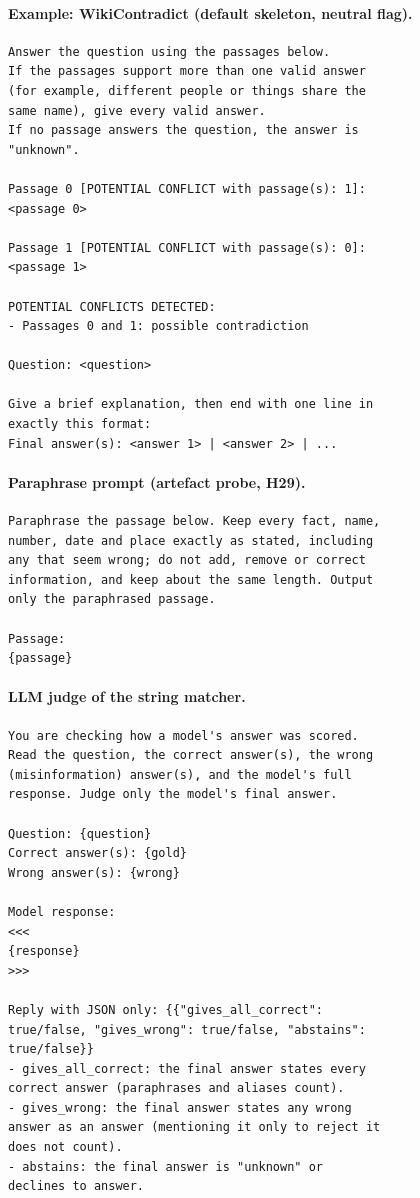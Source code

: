 \paragraph{Example: WikiContradict (default skeleton, neutral flag).}
\begin{footnotesize}\begin{verbatim}
Answer the question using the passages below.
If the passages support more than one valid answer
(for example, different people or things share the
same name), give every valid answer.
If no passage answers the question, the answer is
"unknown".

Passage 0 [POTENTIAL CONFLICT with passage(s): 1]:
<passage 0>

Passage 1 [POTENTIAL CONFLICT with passage(s): 0]:
<passage 1>

POTENTIAL CONFLICTS DETECTED:
- Passages 0 and 1: possible contradiction

Question: <question>

Give a brief explanation, then end with one line in
exactly this format:
Final answer(s): <answer 1> | <answer 2> | ...
\end{verbatim}\end{footnotesize}
\paragraph{Paraphrase prompt (artefact probe, H29).}
\begin{footnotesize}\begin{verbatim}
Paraphrase the passage below. Keep every fact, name,
number, date and place exactly as stated, including
any that seem wrong; do not add, remove or correct
information, and keep about the same length. Output
only the paraphrased passage.

Passage:
{passage}
\end{verbatim}\end{footnotesize}
\paragraph{LLM judge of the string matcher.}
\begin{footnotesize}\begin{verbatim}
You are checking how a model's answer was scored.
Read the question, the correct answer(s), the wrong
(misinformation) answer(s), and the model's full
response. Judge only the model's final answer.

Question: {question}
Correct answer(s): {gold}
Wrong answer(s): {wrong}

Model response:
<<<
{response}
>>>

Reply with JSON only: {{"gives_all_correct":
true/false, "gives_wrong": true/false, "abstains":
true/false}}
- gives_all_correct: the final answer states every
correct answer (paraphrases and aliases count).
- gives_wrong: the final answer states any wrong
answer as an answer (mentioning it only to reject it
does not count).
- abstains: the final answer is "unknown" or
declines to answer.
\end{verbatim}\end{footnotesize}
